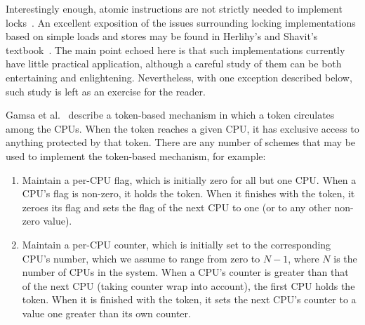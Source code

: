 Interestingly enough, atomic instructions are not strictly needed to
implement locks~\cite{Dijkstra65a,Lamport74a}.
An excellent exposition of the issues surrounding locking implementations
based on simple loads and stores may be found in Herlihy's and
Shavit's textbook~\cite{HerlihyShavit2008Textbook,HerlihyShavit2020Textbook}.
The main point echoed here is that such implementations currently
have little practical application, although a careful study of
them can be both entertaining and enlightening.
Nevertheless, with one exception described below, such study is left
as an exercise for the reader.

Gamsa et al.~\cite[Section 5.3]{Gamsa99} describe a token-based
mechanism in which a token circulates among the CPUs.
When the token reaches a given CPU, it has exclusive
access to anything protected by that token.
There are any number of schemes that may be used to implement
the token-based mechanism, for example:

\begin{enumerate}
\item	Maintain a per-CPU flag, which is initially
	zero for all but one CPU\@.
	When a CPU's flag is non-zero, it holds the token.
	When it finishes with the token, it zeroes its flag and
	sets the flag of the next CPU to one (or to any other
	non-zero value).
\item	Maintain a per-CPU counter, which is initially set
	to the corresponding CPU's number, which we assume
	to range from zero to $N-1$, where $N$ is the number
	of CPUs in the system.
	When a CPU's counter is greater than that of the next
	CPU (taking counter wrap into account), the first CPU holds the token.
	When it is finished with the token, it sets the next
	CPU's counter to a value one greater than its own counter.
\end{enumerate}

